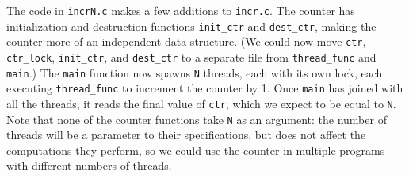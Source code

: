 \documentclass[11pt]{article} %
\begin{document}
The code in \texttt{incrN.c} makes a few additions to \texttt{incr.c}. The counter has initialization and destruction functions \texttt{init\_ctr} and \texttt{dest\_ctr}, making the counter more of an independent data structure. (We could now move \texttt{ctr}, \texttt{ctr\_lock}, \texttt{init\_ctr}, and \texttt{dest\_ctr} to a separate file from \texttt{thread\_func} and \texttt{main}.) The \texttt{main} function now spawns \texttt{N} threads, each with its own lock, each executing \texttt{thread\_func} to increment the counter by 1. Once \texttt{main} has joined with all the threads, it reads the final value of \texttt{ctr}, which we expect to be equal to \texttt{N}. Note that none of the counter functions take \texttt{N} as an argument: the number of threads will be a parameter to their specifications, but does not affect the computations they perform, so we could use the counter in multiple programs with different numbers of threads.
\end{document}
